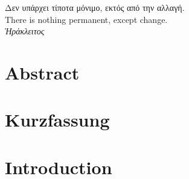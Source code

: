 \newcommand{\myKeywordStyle}[1]{{\footnotesize\sffamily\color{green!70!black} #1}}
 
\newcommand{\myGlobalStyle}[1]{{\footnotesize\sffamily\color{blue!100!black} #1}}
 
\newcommand{\myNumberStyle}[1]{{\footnotesize\sffamily\color{brown!100!black} #1}}









\frontmatter



\thispagestyle{empty}
\begin{center}

\hspace{0pt}
\vfill

\Large\foreignlanguage{greek}{Δεν υπάρχει τίποτα μόνιμο, εκτός από την αλλαγή.\\}
\vspace{0.5cm}
\normalsize{There is nothing permanent, except change.\\}
\vspace{1cm}
\color{auburn}\foreignlanguage{greek}{\textit{Ἡράκλειτος}}
\vfill
\hspace{0pt}
\end{center}
\chapter*{Abstract}
\chapter*{Kurzfassung}
%
\mainmatter
\chapter{Introduction}
\label{chap:intro}



